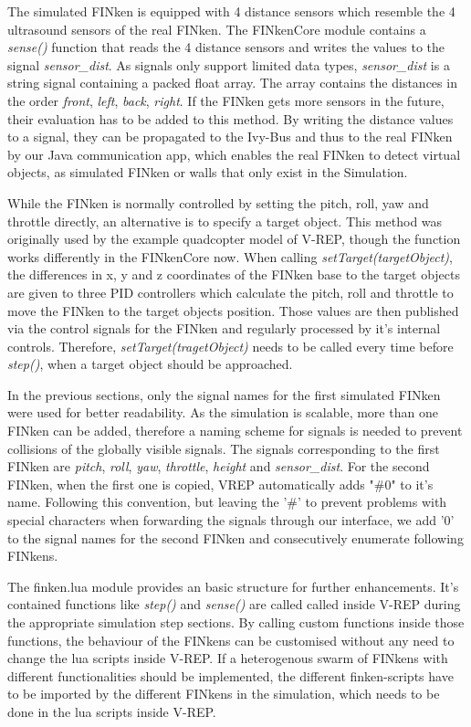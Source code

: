 The simulated FINken is equipped with 4 distance sensors which resemble the 4 ultrasound sensors of the real FINken. The FINkenCore module contains a \textit{sense()} function that reads the 4 distance sensors and writes the values to the signal \textit{sensor\_dist}. As signals only support limited data types, \textit{sensor\_dist} is a string signal containing a packed float array. The array contains the distances in the order \textit{front}, \textit{left}, \textit{back}, \textit{right}.  If the FINken gets more sensors in the future, their evaluation has to be added to this method.
By writing the distance values to a signal, they can be propagated to the Ivy-Bus and thus to the real FINken by our Java communication app, which enables the real FINken to detect virtual objects, as simulated FINken or walls that only exist in the Simulation.


While the FINken is normally controlled by setting the pitch, roll, yaw and throttle directly, an alternative is to specify a target object. This method was originally used by the example quadcopter model of V-REP, though the function works differently in the FINkenCore now. When calling  \textit{setTarget(targetObject)}, the differences in x, y and z coordinates of the FINken base to the target objects are given to three PID controllers which calculate the pitch, roll and throttle to move the FINken to the target objects position. Those values are then published via the control signals for the FINken and regularly processed by it's internal controls. Therefore, \textit{setTarget(tragetObject)} needs to be called every time before \textit{step()}, when a target object should be approached.

In the previous sections, only the signal names for the first simulated FINken were used for better readability. As the simulation is scalable, more than one FINken can be added, therefore a naming scheme for signals is needed to prevent collisions of the globally visible signals. The signals corresponding to the first FINken are \textit{pitch}, \textit{roll}, \textit{yaw}, \textit{throttle}, \textit{height} and \textit{sensor\_dist}. For the second FINken, when the first one is copied, VREP automatically adds "\#0" to it's name. Following this convention, but leaving the '\#' to prevent problems with special characters when forwarding the signals through our interface, we add '0' to the signal names for the second FINken and consecutively enumerate following FINkens.

The finken.lua module provides an basic structure for further enhancements. It's contained functions like \textit{step()} and \textit{sense()} are called called inside V-REP during the appropriate simulation step sections. By calling custom functions inside those functions, the behaviour of the FINkens can be customised without any need to change the lua scripts inside V-REP. If a heterogenous swarm of FINkens with different functionalities should be implemented, the different finken-scripts have to be imported by the different FINkens in the simulation, which needs to be done in the lua scripts inside V-REP.


